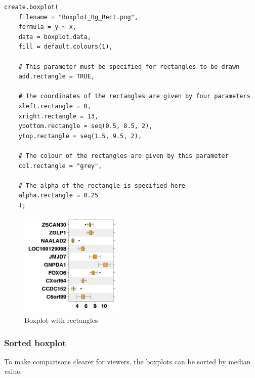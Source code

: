 \documentclass[letterpaper]{article}
\begin{document}
\begin{verbatim}
create.boxplot(
    filename = "Boxplot_Bg_Rect.png",
    formula = y ~ x, 
    data = boxplot.data,
    fill = default.colours(1),
	
    # This parameter must be specified for rectangles to be drawn
    add.rectangle = TRUE,
	
    # The coordinates of the rectangles are given by four parameters
    xleft.rectangle = 0,
    xright.rectangle = 13,
    ybottom.rectangle = seq(0.5, 8.5, 2),
    ytop.rectangle = seq(1.5, 9.5, 2),
	
    # The colour of the rectangles are given by this parameter
    col.rectangle = "grey",
	
    # The alpha of the rectangle is specified here
    alpha.rectangle = 0.25
    );
\end{verbatim}
\begin{figure}[!ht]
  \begin{center}
     \includegraphics[width=50mm]{Figures/Boxplot_Bg_Rect.png}
     \caption{Boxplot with rectangles}
  \end{center}
\end{figure}

\subsubsection{Sorted boxplot}
To make comparisons clearer for viewers, the boxplots can be sorted by median value.
\end{document}
